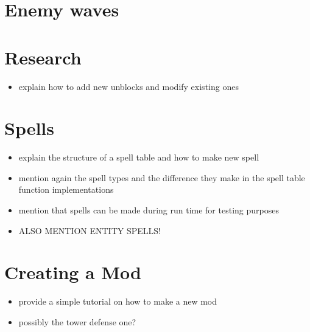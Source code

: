 \section{Enemy waves}


\section{Research}

\begin{itemize}
    \item explain how to add new unblocks and modify existing ones
\end{itemize}

\section{Spells}

\begin{itemize}
    \item explain the structure of a spell table and how to make new spell
    \item mention again the spell types and the difference they make
        in the spell table function implementations
    \item mention that spells can be made during run time for testing
        purposes
    \item ALSO MENTION ENTITY SPELLS!
\end{itemize}

\section{Creating a Mod}

\begin{itemize}
    \item provide a simple tutorial on how to make a new mod
    \item possibly the tower defense one?
\end{itemize}
